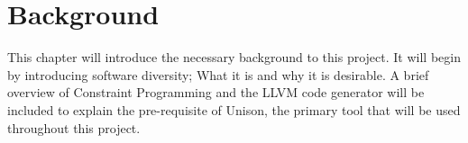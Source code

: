 \chapter{Background}

This chapter will introduce the necessary background to this project. It will begin by
introducing software diversity; What it is and why it is desirable. A brief overview of
Constraint Programming and the LLVM code generator will be included to explain the
pre-requisite of Unison, the primary tool that will be used throughout this project.








